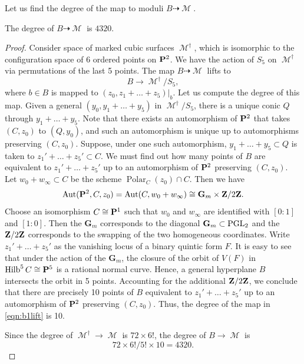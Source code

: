 \documentclass[12pt,reqno]{amsart}
\DeclareMathOperator{\Polar}{Polar}
\DeclareMathOperator{\Hilb}{Hilb}
\DeclareMathOperator{\M}{\mathcal{M}}
\renewcommand{\to}{{\longrightarrow}}
\numberwithin{equation}{section}
\newcommand{\G}{\mathbf G}
\begin{document}
Let us find the degree of the map to moduli $B \dashrightarrow \M$.
\begin{proposition}\label{lem:deg1}
  The degree of $B \dashrightarrow \M$ is $4320$.
\end{proposition}
\begin{proof}
  Consider space of marked cubic surfaces $\M^\dagger$, which is isomorphic to the configuration space of 6 ordered points on $\P^2$.
  We have the action of $S_5$ on $\M^\dagger$ via permutations of the last 5 points.
  The map $B \dashrightarrow \M$ lifts to
  \begin{equation}\label{eqn:b1lift}
    B \to \M^\dagger / S_5,
  \end{equation}
  where $b \in B$ is mapped to $(z_0, z_1 + \dots + z_5)|_b$.
  Let us compute the degree of this map.
  Given a general $(y_0, y_1 + \dots + y_5)$ in $\M^\dagger / S_5$, there is a unique conic $Q$ through $y_1 + \dots + y_5$.
  Note that there exists an automorphism of $\P^2$ that takes $(C, z_0)$ to $(Q, y_0)$, and such an automorphism is unique up to automorphisms preserving $(C, z_0)$.
  Suppose, under one such automorphism, $y_1 + \dots + y_5 \subset Q$ is taken to $z_1' + \dots + z_5' \subset C$.
  We must find out how many points of $B$ are equivalent to $z_1' + \dots + z_5'$ up to an automorphism of $\P^2$ preserving $(C, z_0)$.
  Let $w_0 + w_\infty \subset C$ be the scheme $\Polar_C(z_0) \cap C$.
  Then we have
   \[\Aut(\P^2, C, z_0) = \Aut(C, w_0 + w_{\infty}) \cong \G_m \times \Z/2\Z. \]
   Choose an isomorphism $C \cong \P^1$ such that $w_0$ and $w_\infty$ are identified with $[0:1]$ and $[1:0]$.
   Then the $\G_m$ corresponds to the diagonal $\G_m \subset \PGL_2$ and the $\Z/2\Z$ corresponds to the swapping of the two homogeneous coordinates.
   Write $z_1' + \dots + z_5'$ as the vanishing locus of a binary quintic form $F$.
   It is easy to see that under the action of the $\G_m$, the closure of the orbit of $V(F)$ in $\Hilb^5 C \cong \P^5$ is a rational normal curve.
   Hence, a general hyperplane $B$ intersects the orbit in 5 points.
   Accounting for the additional $\Z/2\Z$, we conclude that there are precisely 10 points of $B$ equivalent to $z_1' + \dots + z_5'$ up to an automorphism of $\P^2$ preserving $(C, z_0)$.
   Thus, the degree of the map in \eqref{eqn:b1lift} is 10.

   Since the degree of $\M^\dagger \to \M$ is $72 \times 6!$, the degree of $B \to \M$ is
   \[72 \times 6! / 5! \times 10 = 4320.\]
\end{proof}
\end{document}

